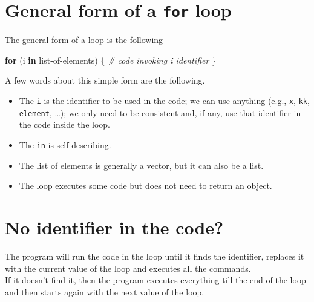 \documentclass[]{book}
\newenvironment{Shaded}{}{}
\newcommand{\CommentTok}[1]{\textcolor[rgb]{0.38,0.63,0.69}{\textit{#1}}}
\newcommand{\ControlFlowTok}[1]{\textcolor[rgb]{0.00,0.44,0.13}{\textbf{#1}}}
\newcommand{\NormalTok}[1]{#1}
\newcommand{\OperatorTok}[1]{\textcolor[rgb]{0.40,0.40,0.40}{#1}}
\providecommand{\tightlist}{%
  \setlength{\itemsep}{0pt}\setlength{\parskip}{0pt}}
\theoremstyle{definition}
\theoremstyle{definition}
\theoremstyle{definition}
\theoremstyle{remark}
\begin{document}
\hypertarget{general-form-of-a-for-loop}{%
\section{\texorpdfstring{General form of a \texttt{for}
loop}{General form of a for loop}}\label{general-form-of-a-for-loop}}

The general form of a loop is the following

\begin{Shaded}
\begin{Highlighting}[]
\ControlFlowTok{for}\NormalTok{ (i }\ControlFlowTok{in}\NormalTok{ list}\OperatorTok{-}\NormalTok{of}\OperatorTok{-}\NormalTok{elements) \{}
\CommentTok{# code invoking i identifier}
\NormalTok{\}}
\end{Highlighting}
\end{Shaded}

A few words about this simple form are the following.

\begin{itemize}
\tightlist
\item
  The \texttt{i} is the identifier to be used in the code; we can use
  anything (e.g., \texttt{x}, \texttt{kk}, \texttt{element}, \ldots); we
  only need to be consistent and, if any, use that identifier in the
  code inside the loop.
\item
  The \texttt{in} is self-describing.
\item
  The list of elements is generally a vector, but it can also be a list.
\item
  The loop executes some code but does not need to return an object.
\end{itemize}

\hypertarget{no-identifier-in-the-code}{%
\section{No identifier in the code?}\label{no-identifier-in-the-code}}

The program will run the code in the loop until it finds the identifier,
replaces it with the current value of the loop and executes all the
commands.\\
If it doesn't find it, then the program executes everything till the end
of the loop and then starts again with the next value of the loop.
\end{document}
